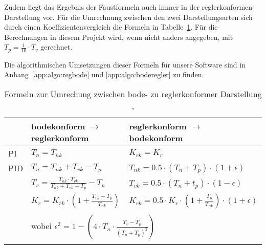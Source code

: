 Zudem   liegt   das   Ergebnis   der    Faustformeln   auch   immer   in   der
reglerkonformen  Darstellung  vor. F\"ur  die  Umrechnung  zwischen  den  zwei
Darstellungsarten  sich  durch  einen Koeffizientenvergleich  die  Formeln  in
Tabelle~\ref{tab:bode_regler_konform}.   F\"ur  die   Berechnungen  in  diesem
Projekt wird,  wenn nicht anders  angegeben, mit $T_p=\frac{1}{10}  \cdot T_v$
gerechnet.

Die algorithmischen Umsetzungen  dieser Formeln f\"ur unsere  Software sind in
Anhang~\ref{app:algo:regbode} und \ref{app:algo:boderegler} zu finden.

\begin{longtable}{l|ll}
    \toprule


    &
    bodekonform $\rightarrow$ reglerkonform
    &
    reglerkonform $\rightarrow$ bodekonform
    \\

    \midrule

    \endhead
    \endfoot
    \endlastfoot


    PI
    &
    $T_n = T_{nk} $ %
    &
    $K_{rk} = K_r $ %
    \\

    \midrule

    PID
    &
    $T_n = T_{nk}+T_{vk}-T_p$
    &
    $T_{nk}=0.5 \cdot (T_n+T_p) \cdot (1+\epsilon)$
    \\

    &
    $T_v=\frac{T_{nk} \cdot T_{vk}}{T_{nk}+T_{vk}-T_p}-T_p$
    &
    $T_{vk}=0.5 \cdot (T_n+t_p) \cdot (1-\epsilon)$
    \\

    &
    $K_r=K_{rk} \cdot (1 + \frac{T_{vk}-T_p}{T_{nk}})$
    &
    $K_{rk} = 0.5 \cdot K_r \cdot (1 + \frac{T_p}{T_{nk}}) \cdot (1+\epsilon )$
    \\
    \\

    &
    \multicolumn{2}{l}{wobei $\epsilon^2 = 1-(4 \cdot T_n \cdot \frac{T_v-T_p}{(T_n+T_p)^2})$}
    \\
    \bottomrule
    \caption{Formeln zur Umrechung zwischen bode- zu reglerkonformer Darstellung \cite{regelungstechnik:zellweger}, \cite{regelungstechnik:schumleon}}
    \label{tab:bode_regler_konform}
\end{longtable}


